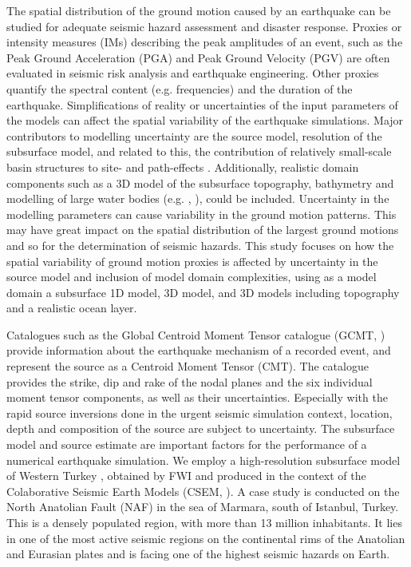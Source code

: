 \documentclass[../Text/00main.tex]{subfiles}
\begin{document}
The spatial distribution of the ground motion caused by an earthquake can be studied for adequate seismic hazard assessment and disaster response. Proxies or intensity measures (IMs) describing the peak amplitudes of an event, such as the Peak Ground Acceleration (PGA) and Peak Ground Velocity (PGV) are often evaluated in seismic risk analysis and earthquake engineering. Other proxies quantify the spectral content (e.g. frequencies) and the duration of the earthquake. Simplifications of reality or uncertainties of the input parameters of the models can affect the spatial variability of the earthquake simulations. Major contributors to modelling uncertainty are the source model, resolution of the subsurface model, and related to this, the contribution of relatively small-scale basin structures to site- and path-effects \citep{igel_computational_2017}. Additionally, realistic domain components such as a 3D model of the subsurface topography, bathymetry and modelling of large water bodies (e.g. \cite{afanasiev2019effect}, \citet{imperatori2015role}), could be included. Uncertainty in the modelling parameters can cause variability in the ground motion patterns. This may have great impact on the spatial distribution of the largest ground motions and so for the determination of seismic hazards. This study focuses on how the spatial variability of ground motion proxies is affected by uncertainty in the source model and inclusion of model domain complexities, using as a model domain a subsurface 1D model, 3D model, and 3D models including topography and a realistic ocean layer. 

Catalogues such as the Global Centroid Moment Tensor catalogue (GCMT, \citet{ekstrom2012global}) provide information about the earthquake mechanism of a recorded event, and represent the source as a Centroid Moment Tensor (CMT). The catalogue provides the strike, dip and rake of the nodal planes and the six individual moment tensor components, as well as their uncertainties.  Especially with the rapid source inversions done in the urgent seismic simulation context, location, depth and composition of the source are subject to uncertainty. The subsurface model and source estimate are important factors for the performance of a numerical earthquake simulation. We employ a high-resolution subsurface model of Western Turkey \citep{cubuk-sabuncu_3-d_2017}, obtained by FWI and produced in the context of the Colaborative Seismic Earth Models (CSEM, \citet{afanasiev2016foundations}). A case study is conducted on the North Anatolian Fault (NAF) in the sea of Marmara, south of Istanbul, Turkey. This is a densely populated region, with more than 13 million inhabitants. It lies in one of the most active seismic regions on the continental rims of the Anatolian and Eurasian plates and is facing one of the highest seismic hazards on Earth.
\end{document}
